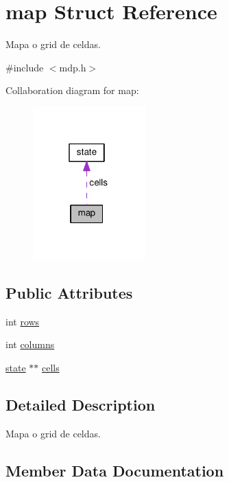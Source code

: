 \hypertarget{structmap}{}\section{map Struct Reference}
\label{structmap}


Mapa o grid de celdas.  




{\ttfamily \#include $<$mdp.\+h$>$}



Collaboration diagram for map\+:\nopagebreak
\begin{figure}[H]
\begin{center}
\leavevmode
\includegraphics[width=123pt]{structmap__coll__graph}
\end{center}
\end{figure}
\subsection*{Public Attributes}
\begin{DoxyCompactItemize}
\item 
int \hyperlink{structmap_a2ee828fe96a115fe070e8ff8eea7b488}{rows}
\item 
int \hyperlink{structmap_a8519a22ad01493b189ad4ee64eb5b7dc}{columns}
\item 
\hyperlink{structstate}{state} $\ast$$\ast$ \hyperlink{structmap_a8aeb7b72916950e546c70ec3567c2e21}{cells}
\end{DoxyCompactItemize}


\subsection{Detailed Description}
Mapa o grid de celdas. 

\subsection{Member Data Documentation}
